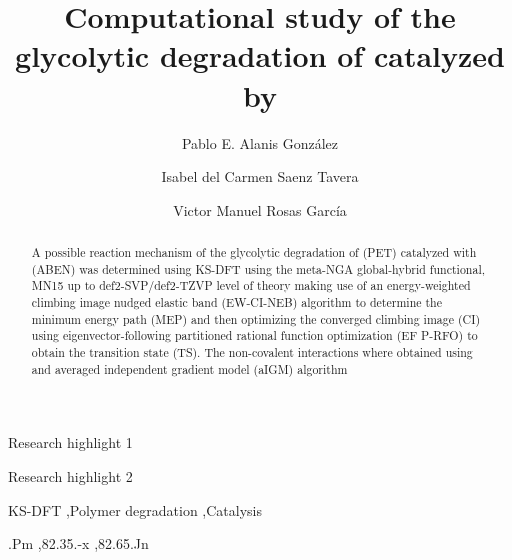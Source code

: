 \begin{frontmatter}

    \title{Computational study of the glycolytic degradation of  catalyzed by }

    \author[1]{Pablo E. Alanis González}

    \author[1]{Isabel del Carmen Saenz Tavera}

    \author[1]{Victor Manuel Rosas García}


    \begin{abstract}
        A possible reaction mechanism of the glycolytic degradation of  (PET) catalyzed with  (ABEN) was determined using KS-DFT using the meta-NGA global-hybrid functional, MN15 \cite{Yu2016a} up to def2-SVP/def2-TZVP level of theory making use of an energy-weighted climbing image nudged elastic band (EW-CI-NEB) algorithm \cite{Asgeirsson2021} to determine the minimum energy path (MEP) and then optimizing the converged climbing image (CI) using eigenvector-following partitioned rational function optimization (EF P-RFO) to obtain the transition state (TS). The non-covalent interactions where obtained using and averaged independent gradient model (aIGM) algorithm \cite{Lefebvre2018}
    \end{abstract}

    \begin{graphicalabstract}
    \end{graphicalabstract}

    \begin{highlights}
        \item Research highlight 1
        \item Research highlight 2
    \end{highlights}

    \begin{keyword}

        KS-DFT \sep Polymer degradation \sep Catalysis

        .Pm \sep 82.35.-x \sep 82.65.Jn
    \end{keyword}

\end{frontmatter}